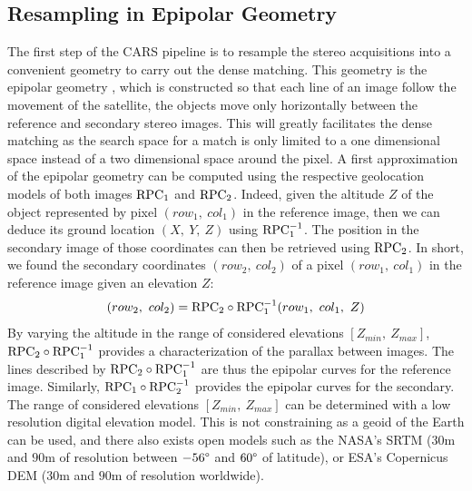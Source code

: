 \subsection{Resampling in Epipolar Geometry}\label{sec:epipolar_geometry}
The first step of the CARS pipeline is to resample the stereo acquisitions into a convenient geometry to carry out the dense matching. This geometry is the epipolar geometry \cite{cnes_imagerie_2008}, which is constructed so that each line of an image follow the movement of the satellite, \ie the objects move only horizontally between the reference and secondary stereo images. This will greatly facilitates the dense matching as the search space for a match is only limited to a one dimensional space instead of a two dimensional space around the pixel. A first approximation of the epipolar geometry can be computed using the respective geolocation models of both images ${\mathrm{RPC}}_1$ and ${\mathrm{RPC}}_2$. Indeed, given the altitude $Z$ of the object represented by pixel $(row_1, ~col_1)$ in the reference image, then we can deduce its ground location $(X, ~Y, ~Z)$ using ${\mathrm{RPC}}_1^{-1}$. The position in the secondary image of those coordinates can then be retrieved using ${\mathrm{RPC}}_2$. In short, we found the secondary coordinates $(row_2,~col_2)$ of a pixel $(row_1,~col_1)$ in the reference image given an elevation $Z$: 
\begin{equation}
    (row_2,~col_2) = {\mathrm{RPC}}_2\circ{\mathrm{RPC}}_1^{-1}(row_1, ~col_1, ~Z)\label{eq:epipolar_transfer}
\end{equation}
By varying the altitude in the range of considered elevations $[Z_{min},~Z_{max}]$, ${\mathrm{RPC}}_2\circ{\mathrm{RPC}}_1^{-1}$ provides a characterization of the parallax between images. The lines described by ${\mathrm{RPC}}_2\circ{\mathrm{RPC}}_1^{-1}$ are thus the epipolar curves for the reference image. Similarly, ${\mathrm{RPC}}_1\circ{\mathrm{RPC}}_2^{-1}$ provides the epipolar curves for the secondary. The range of considered elevations $[Z_{min},~Z_{max}]$ can be determined with a low resolution digital elevation model. This is not constraining as a geoid of the Earth can be used, and there also exists open models such as the NASA's SRTM \cite{farr_shuttle_2007} ($30$m and $90$m of resolution between $-56\degree$ and $60\degree$ of latitude), or ESA's Copernicus DEM ($30$m and $90$m of resolution worldwide).  

